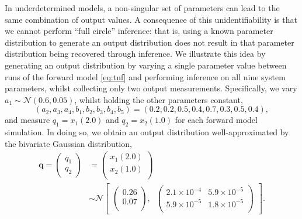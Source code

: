 %
In underdetermined models, a non-singular set of parameters can lead to the same combination of output values. A consequence of this unidentifiability is that we cannot perform ``full circle'' inference: that is, using a known parameter distribution to generate an output distribution does not result in that parameter distribution being recovered through inference. We illustrate this idea by generating an output distribution by varying a single parameter value between runs of the forward model \eqref{eq:tnf} and performing inference on all nine system parameters, whilst collecting only two output measurements. Specifically, we vary $a_1\sim \mathcal{N}(0.6, 0.05)$, whilst holding the other parameters constant, $$(a_2,a_3,a_4,b_1,b_2,b_3,b_4,b_5)=(0.2, 0.2, 0.5, 0.4, 0.7, 0.3, 0.5, 0.4),$$ and measure $q_1=x_1(2.0)$ and $q_2=x_2(1.0)$ for each forward model simulation. In doing so, we obtain an output distribution well-approximated by the bivariate Gaussian distribution,
%
\begin{equation}\label{eq:tnf_circular_target}
\begin{aligned}
\boldsymbol{q} = \begin{pmatrix} q_1 \\ q_2 \end{pmatrix}
&=
\begin{pmatrix}
x_1(2.0)\\
x_2(1.0)\\
\end{pmatrix} \\
&\sim  \mathcal{N}
\begin{bmatrix}
\begin{pmatrix}
0.26\\
0.07\\
\end{pmatrix}, \;\;
\begin{pmatrix}
2.1\times 10^{-4} & 5.9\times 10^{-5}\\
5.9\times 10^{-5} & 1.8\times 10^{-5}\\
\end{pmatrix}
\end{bmatrix}.
\end{aligned}
\end{equation}
%
